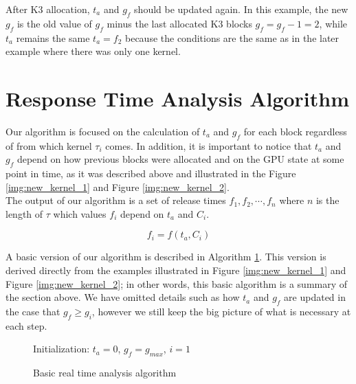 \documentclass[
  12pt,
  a4paperpaper,
]{report}
\begin{document}
After K3 allocation, \(t_a\) and \(g_f\) should be updated again. In
this example, the new \(g_f\) is the old value of \(g_f\) minus the last
allocated K3 blocks \(g_f = g_f - 1 = 2\), while \(t_a\) remains the
same \(t_a = f_2\) because the conditions are the same as in the later
example where there was only one kernel.

\hypertarget{response-time-analysis-algorithm}{%
\section{Response Time Analysis
Algorithm}\label{response-time-analysis-algorithm}}

Our algorithm is focused on the calculation of \(t_a\) and \(g_f\) for
each block regardless of from which kernel \(\tau_i\) comes. In addition, it is
important to notice that \(t_a\) and \(g_f\) depend on how previous
blocks were allocated and on the GPU state at some point in time, as it
was described above and illustrated in the Figure \ref{img:new_kernel_1}
and Figure \ref{img:new_kernel_2}.\\
The output of our algorithm is a set of release times
\({f_1, f_2, \cdots, f_n}\) where \(n\) is the length of \(\tau\) which
values \(f_i\) depend on \(t_a\) and \(C_i\).

\begin{equation}
f_i = f(t_a, C_i)
\end{equation}

A basic version of our algorithm is described in Algorithm
\ref{alg:basic}. This version is derived directly from the examples
illustrated in Figure \ref{img:new_kernel_1} and Figure
\ref{img:new_kernel_2}; in other words, this basic algorithm is a
summary of the section above. We have omitted details such as how
\(t_a\) and \(g_f\) are updated in the case that \(g_f \geq g_i\),
however we still keep the big picture of what is necessary at each step.

\begin{figure}[ht]
\centering
\begin{minipage}{.7\linewidth}
    \begin{algorithm}[H]
        \DontPrintSemicolon
        \SetAlgoLined
        \Input{$\tau$}
        \BlankLine
        Initialization: $t_a = 0$, $g_f = g_{max}$, $i=1$ \\
        \caption{Basic real time analysis algorithm }
        \label{alg:basic}
    \end{algorithm} 
  \end{minipage}
\end{figure}
\end{document}
